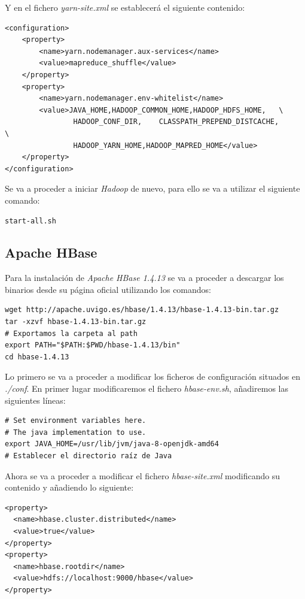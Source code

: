 \documentclass[11pt,a4paper]{article}
\begin{document}
Y en el fichero \emph{yarn-site.xml} se establecerá el siguiente contenido:

\begin{lstlisting}
<configuration>
    <property>
        <name>yarn.nodemanager.aux-services</name>
        <value>mapreduce_shuffle</value>
    </property>
    <property>
        <name>yarn.nodemanager.env-whitelist</name>
        <value>JAVA_HOME,HADOOP_COMMON_HOME,HADOOP_HDFS_HOME,	\
        		HADOOP_CONF_DIR,	CLASSPATH_PREPEND_DISTCACHE,		\
        		HADOOP_YARN_HOME,HADOOP_MAPRED_HOME</value>
    </property>
</configuration>
\end{lstlisting}

Se va a proceder a iniciar \emph{Hadoop} de nuevo, para ello se va a utilizar el siguiente comando:

\begin{lstlisting}
start-all.sh
\end{lstlisting}

\subsection{Apache HBase}

Para la instalación de \emph{Apache HBase 1.4.13} se va a proceder a descargar los binarios desde su página oficial utilizando los comandos:

\begin{lstlisting}
wget http://apache.uvigo.es/hbase/1.4.13/hbase-1.4.13-bin.tar.gz
tar -xzvf hbase-1.4.13-bin.tar.gz
# Exportamos la carpeta al path
export PATH="$PATH:$PWD/hbase-1.4.13/bin" 
cd hbase-1.4.13
\end{lstlisting}

Lo primero se va a proceder a modificar los ficheros de configuración situados en \emph{./conf}. En primer lugar modificaremos el fichero \emph{hbase-env.sh}, añadiremos las siguientes líneas:

\begin{lstlisting}
# Set environment variables here.
# The java implementation to use.
export JAVA_HOME=/usr/lib/jvm/java-8-openjdk-amd64
# Establecer el directorio raíz de Java
\end{lstlisting}

Ahora se va a proceder a modificar el fichero \emph{hbase-site.xml} modificando su contenido y añadiendo lo siguiente:

\begin{lstlisting}
<property>
  <name>hbase.cluster.distributed</name>
  <value>true</value>
</property>
<property>
  <name>hbase.rootdir</name>
  <value>hdfs://localhost:9000/hbase</value>
</property>
\end{lstlisting}
\end{document}
